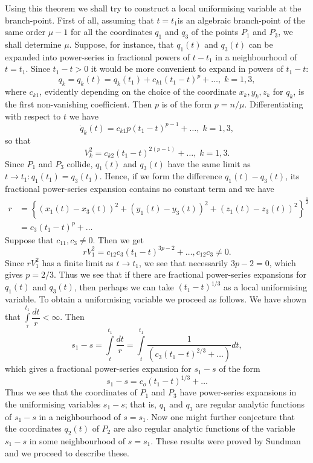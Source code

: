 Using this theorem we shall try to construct a local uniformising variable at the branch-point. First of all, assuming that $t = t_1$\pageoriginale is an algebraic branch-point of the same order $\mu-1$ for all the coordinates $q_1$ and $q_3$ of the points $P_1$ and $P_3$, we shall determine $\mu$. Suppose, for instance, that $q_1(t)$ and $q_3(t)$ can be expanded into power-series in fractional powers of $t-t_1$ in a neighbourhood of $t = t_1$. Since $t_1 - t>0$ it would be more convenient to expand in powers of $t_1 - t$:
$$
q_k = q_k (t) = q_k(t_1) + c_{k1} (t_1 -t)^p + \ldots, \; k =1,3,
$$
where $c_{k1}$, evidently depending on the choice of the coordinate $x_k , y_k, z_k$ for $q_k$, is the first non-vanishing coefficient. Then $p$ is of the form $p=n/\mu$. Differentiating with respect to $t$ we have
$$
\dot{q}_k (t) = c_{k1} p(t_1 - t)^{p-1} + \ldots, \; k =1,3,
$$
so that
$$
V^2_k = c_{k2} (t_1 -t)^{2(p-1)} + \ldots, \; k = 1,3.
$$
Since $P_1$ and $P_3$ collide, $q_1(t)$ and $q_3 (t)$ have the same limit as $t \to t_1: q_1(t_1) = q_3 (t_1)$. Hence, if we form the difference $q_1(t) - q_3(t)$, its fractional power-series expansion contains no constant term and we have
\begin{align*}
r & = \left\{ (x_1 (t) - x_3 (t))^2 + (y_1(t) - y_3(t))^2 + (z_1 (t) - z_3 (t))^2 \right\}^{\frac{1}{2}}\\
& = c_3 (t_1 - t)^p+ \ldots 
\end{align*}
Suppose that $c_{11}, c_3 \neq 0$. Then we get
$$
rV^2_1 = c_{12} c_3 (t_1 - t)^{3p-2} + \ldots, c_{12} c_3 \neq 0. 
$$\pageoriginale
Since $rV^2_1$ has a finite limit as $t \to t_1$, we see that necessarily $3p-2 =0$, which gives $p = 2/3$. Thus we see that if there are fractional power-series expansions for $q_1(t)$ and $q_3(t)$, then perhaps we can take $(t_1 -t)^{1/3}$ as a local uniformising variable. To obtain a uniformising variable we proceed as follows. We have shown that $\int\limits^{t_1}_{\tau} \dfrac{dt}{r} < \infty$. Then
$$
s_1 - s= \int\limits^{t_1}_t \frac{dt}{r}  = \int\limits^{t_1}_{t} \frac{1}{(c_3 (t_1 - t)^{2/3} + \ldots )} dt,
$$
which gives a fractional power-series expansion for $s_1-s$ of the form
$$
s_1 - s = c_o (t_1 - t)^{1/3} + \ldots
$$
Thus we see that the coordinates of $P_1$ and $P_3$ have power-series expansions in the uniformising variables $s_1 - s$; that is, $q_1$ and $q_3$ are regular analytic functions of $s_1 -s$ in a neighbourhood of $s=s_1$. Now one might further conjecture that the coordinates $q_2(t)$ of $P_2$ are also regular analytic functions of the variable $s_1 -s$ in some neighbourhood of $s = s_1$. These results were proved by Sundman and we proceed to describe these. 

